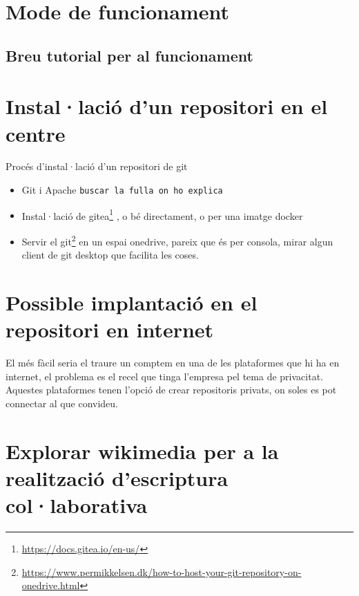 \documentclass[
  10pt,
]{krantz}
\DeclareRobustCommand{\href}[2]{#2\footnote{\url{#1}}}
\begin{document}
\hypertarget{mode-de-funcionament}{%
\section{Mode de funcionament}\label{mode-de-funcionament}}

\hypertarget{breu-tutorial-per-al-funcionament}{%
\subsection{Breu tutorial per al funcionament}\label{breu-tutorial-per-al-funcionament}}

\hypertarget{installaciuxf3-dun-repositori-en-el-centre}{%
\section{Instal·lació d'un repositori en el centre}\label{installaciuxf3-dun-repositori-en-el-centre}}

Procés d'instal·lació d'un repositori de git

\begin{itemize}
\item
  Git i Apache \texttt{buscar\ la\ fulla\ on\ ho\ explica}
\item
  Instal·lació de \href{https://docs.gitea.io/en-us/}{gitea} , o bé directament, o per una imatge docker
\item
  Servir el \href{https://www.permikkelsen.dk/how-to-host-your-git-repository-on-onedrive.html}{git} en un espai onedrive, pareix que és per consola, mirar algun client de git desktop que facilita les coses.
\end{itemize}

\hypertarget{possible-implantaciuxf3-en-el-repositori-en-internet}{%
\section{Possible implantació en el repositori en internet}\label{possible-implantaciuxf3-en-el-repositori-en-internet}}

El més fàcil seria el traure un comptem en una de les plataformes que hi ha en internet, el problema es el recel que tinga l'empresa pel tema de privacitat. Aquestes plataformes tenen l'opció de crear repositoris privats, on soles es pot connectar al que convideu.

\hypertarget{explorar-wikimedia-per-a-la-realitzaciuxf3-descriptura-collaborativa}{%
\section{Explorar wikimedia per a la realització d'escriptura col·laborativa}\label{explorar-wikimedia-per-a-la-realitzaciuxf3-descriptura-collaborativa}}
\end{document}
